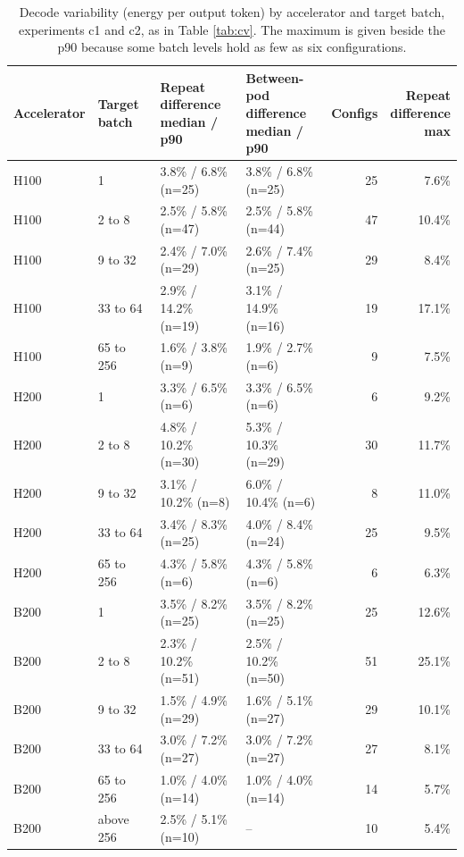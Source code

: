 \begin{table}[t]
\centering
\footnotesize
\setlength{\tabcolsep}{4pt}
\caption{Decode variability (energy per output token) by accelerator and target batch, experiments c1 and c2, as in Table \ref{tab:cv}. The maximum is given beside the p90 because some batch levels hold as few as six configurations.}\label{tab:cv_batch}
\begin{tabular}{llllrr}
\toprule
Accelerator & Target batch & \makecell[l]{Repeat\\difference\\median / p90} & \makecell[l]{Between-pod\\difference\\median / p90} & Configs & \makecell[r]{Repeat\\difference\\max} \\
\midrule
H100 & 1 & 3.8\% / 6.8\% (n=25) & 3.8\% / 6.8\% (n=25) & 25 & 7.6\% \\
H100 & 2 to 8 & 2.5\% / 5.8\% (n=47) & 2.5\% / 5.8\% (n=44) & 47 & 10.4\% \\
H100 & 9 to 32 & 2.4\% / 7.0\% (n=29) & 2.6\% / 7.4\% (n=25) & 29 & 8.4\% \\
H100 & 33 to 64 & 2.9\% / 14.2\% (n=19) & 3.1\% / 14.9\% (n=16) & 19 & 17.1\% \\
H100 & 65 to 256 & 1.6\% / 3.8\% (n=9) & 1.9\% / 2.7\% (n=6) & 9 & 7.5\% \\
H200 & 1 & 3.3\% / 6.5\% (n=6) & 3.3\% / 6.5\% (n=6) & 6 & 9.2\% \\
H200 & 2 to 8 & 4.8\% / 10.2\% (n=30) & 5.3\% / 10.3\% (n=29) & 30 & 11.7\% \\
H200 & 9 to 32 & 3.1\% / 10.2\% (n=8) & 6.0\% / 10.4\% (n=6) & 8 & 11.0\% \\
H200 & 33 to 64 & 3.4\% / 8.3\% (n=25) & 4.0\% / 8.4\% (n=24) & 25 & 9.5\% \\
H200 & 65 to 256 & 4.3\% / 5.8\% (n=6) & 4.3\% / 5.8\% (n=6) & 6 & 6.3\% \\
B200 & 1 & 3.5\% / 8.2\% (n=25) & 3.5\% / 8.2\% (n=25) & 25 & 12.6\% \\
B200 & 2 to 8 & 2.3\% / 10.2\% (n=51) & 2.5\% / 10.2\% (n=50) & 51 & 25.1\% \\
B200 & 9 to 32 & 1.5\% / 4.9\% (n=29) & 1.6\% / 5.1\% (n=27) & 29 & 10.1\% \\
B200 & 33 to 64 & 3.0\% / 7.2\% (n=27) & 3.0\% / 7.2\% (n=27) & 27 & 8.1\% \\
B200 & 65 to 256 & 1.0\% / 4.0\% (n=14) & 1.0\% / 4.0\% (n=14) & 14 & 5.7\% \\
B200 & above 256 & 2.5\% / 5.1\% (n=10) & -- & 10 & 5.4\% \\
\bottomrule
\end{tabular}
\end{table}
